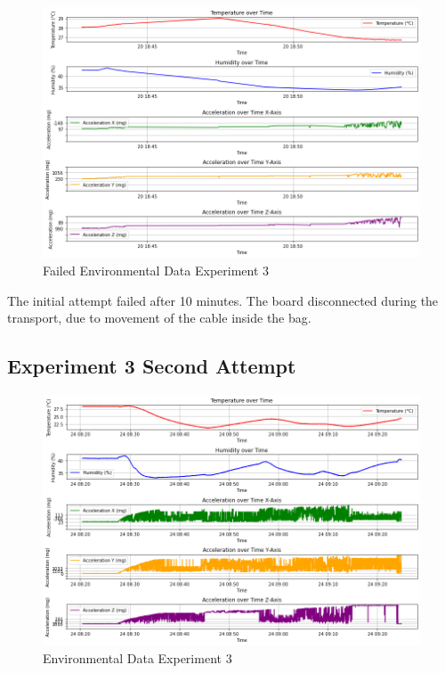 \begin{figure}[H]
    \centering
    \includegraphics[width=1\linewidth]{plot_exp_3_fail.png}
    \caption{Failed Environmental Data Experiment 3}
    \label{fig:Failed Environmental Data Experiment 3}
\end{figure}

The initial attempt failed after 10 minutes. The board disconnected during the transport, due to movement of the cable inside the bag.

\subsection{Experiment 3 Second Attempt}

\begin{figure}[H]
    \centering
    \includegraphics[width=1\linewidth]{plot_exp_3.png}
    \caption{Environmental Data Experiment 3}
    \label{fig:Environmental Data Experiment 3}
\end{figure}

